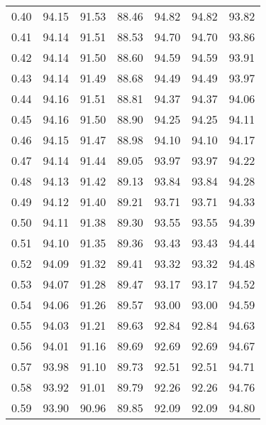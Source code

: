 \begin{tabular}{|c|c|c|c|c|c|c|}
      0.40 &     94.15 &     91.53 &      88.46 &   94.82 &      94.82 &         93.82 \\
      0.41 &     94.14 &     91.51 &      88.53 &   94.70 &      94.70 &         93.86 \\
      0.42 &     94.14 &     91.50 &      88.60 &   94.59 &      94.59 &         93.91 \\
      0.43 &     94.14 &     91.49 &      88.68 &   94.49 &      94.49 &         93.97 \\
      0.44 &     94.16 &     91.51 &      88.81 &   94.37 &      94.37 &         94.06 \\
      0.45 &     94.16 &     91.50 &      88.90 &   94.25 &      94.25 &         94.11 \\
      0.46 &     94.15 &     91.47 &      88.98 &   94.10 &      94.10 &         94.17 \\
      0.47 &     94.14 &     91.44 &      89.05 &   93.97 &      93.97 &         94.22 \\
      0.48 &     94.13 &     91.42 &      89.13 &   93.84 &      93.84 &         94.28 \\
      0.49 &     94.12 &     91.40 &      89.21 &   93.71 &      93.71 &         94.33 \\
      0.50 &     94.11 &     91.38 &      89.30 &   93.55 &      93.55 &         94.39 \\
      0.51 &     94.10 &     91.35 &      89.36 &   93.43 &      93.43 &         94.44 \\
      0.52 &     94.09 &     91.32 &      89.41 &   93.32 &      93.32 &         94.48 \\
      0.53 &     94.07 &     91.28 &      89.47 &   93.17 &      93.17 &         94.52 \\
      0.54 &     94.06 &     91.26 &      89.57 &   93.00 &      93.00 &         94.59 \\
      0.55 &     94.03 &     91.21 &      89.63 &   92.84 &      92.84 &         94.63 \\
      0.56 &     94.01 &     91.16 &      89.69 &   92.69 &      92.69 &         94.67 \\
      0.57 &     93.98 &     91.10 &      89.73 &   92.51 &      92.51 &         94.71 \\
      0.58 &     93.92 &     91.01 &      89.79 &   92.26 &      92.26 &         94.76 \\
      0.59 &     93.90 &     90.96 &      89.85 &   92.09 &      92.09 &         94.80 \\

\end{tabular}
